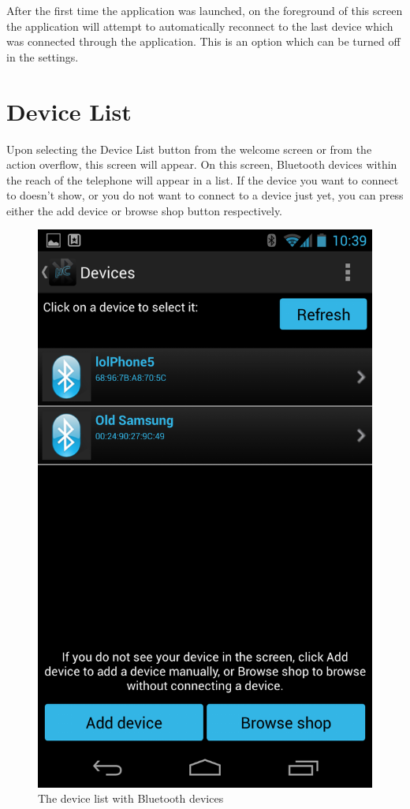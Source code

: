 		After the first time the application was launched, on the foreground of this screen the application will attempt to automatically reconnect to the last device which was connected through the application. This is an option which can be turned off in the settings. 
		\newpage
	\section{Device List}
		Upon selecting the Device List button from the welcome screen or from the action overflow, this screen will appear. On this screen, Bluetooth devices within the reach of the telephone will appear in a list. If the device you want to connect to doesn't show, or you do not want to connect to a device just yet, you can press either the add device or browse shop button respectively.\\
		\newline
		\begin{figure}[H]
			\centering
			\includegraphics[scale = 0.3]{images/Screenshots/device_list.png}
			\caption{The device list with Bluetooth devices}
		\end{figure}
